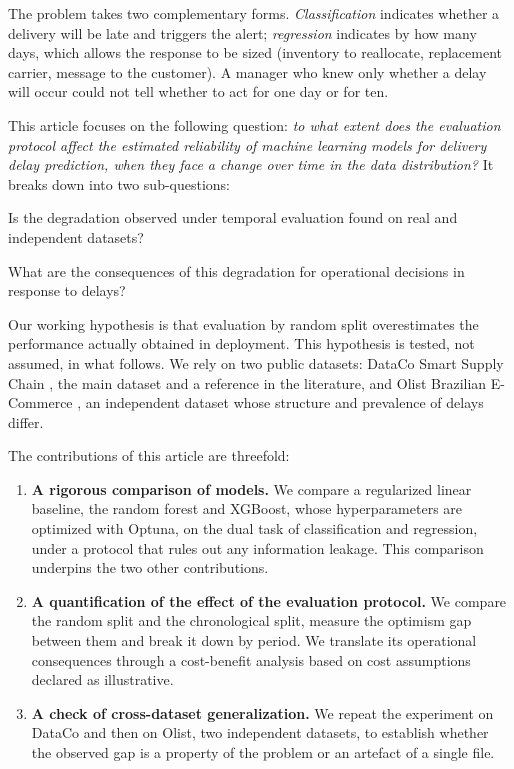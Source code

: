 \documentclass[11pt,a4paper]{article}
\theoremstyle{definition}
\begin{document}
The problem takes two complementary forms. \emph{Classification} indicates whether a delivery will be late and triggers the alert; \emph{regression} indicates by how many days, which allows the response to be sized (inventory to reallocate, replacement carrier, message to the customer). A manager who knew only whether a delay will occur could not tell whether to act for one day or for ten.

This article focuses on the following question: \emph{to what extent does the evaluation protocol affect the estimated reliability of machine learning models for delivery delay prediction, when they face a change over time in the data distribution?} It breaks down into two sub-questions:
\begin{description}[leftmargin=2.2em,style=nextline]
  \item[RQ1] Is the degradation observed under temporal evaluation found on real and independent datasets?
  \item[RQ2] What are the consequences of this degradation for operational decisions in response to delays?
\end{description}
Our working hypothesis is that evaluation by random split overestimates the performance actually obtained in deployment. This hypothesis is tested, not assumed, in what follows. We rely on two public datasets: DataCo Smart Supply Chain \cite{constante2019dataco}, the main dataset and a reference in the literature, and Olist Brazilian E-Commerce \cite{olist2018brazilian}, an independent dataset whose structure and prevalence of delays differ.

The contributions of this article are threefold:
\begin{enumerate}[label=(\roman*)]
  \item \textbf{A rigorous comparison of models.} We compare a regularized linear baseline, the random forest and XGBoost, whose hyperparameters are optimized with Optuna, on the dual task of classification and regression, under a protocol that rules out any information leakage. This comparison underpins the two other contributions.
  \item \textbf{A quantification of the effect of the evaluation protocol.} We compare the random split and the chronological split, measure the optimism gap between them and break it down by period. We translate its operational consequences through a cost-benefit analysis based on cost assumptions declared as illustrative.
  \item \textbf{A check of cross-dataset generalization.} We repeat the experiment on DataCo and then on Olist, two independent datasets, to establish whether the observed gap is a property of the problem or an artefact of a single file.
\end{enumerate}
\end{document}
